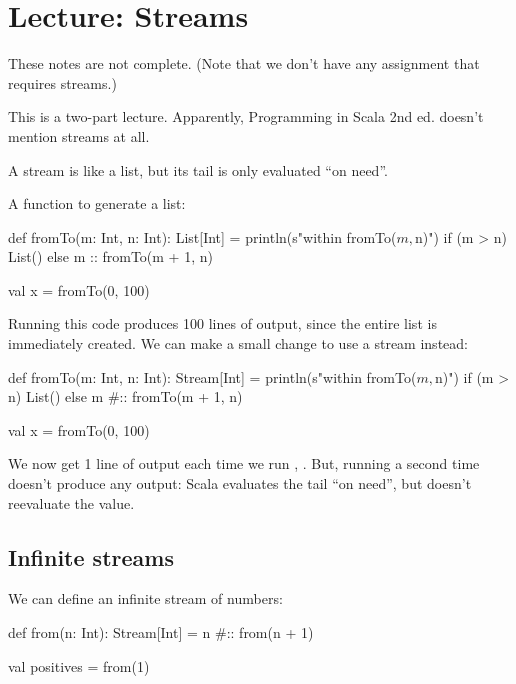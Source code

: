 \startlecture
\chapter{Lecture: Streams}

\begin{instructor}
These notes are not complete. (Note that we don't have any assignment that requires streams.)

This is a two-part lecture.
Apparently, Programming in Scala 2nd ed. doesn't mention streams at all. 
\end{instructor}

A stream is like a list, but its tail is only evaluated ``on need''.

A function to generate a list:

\begin{scalacode}
def fromTo(m: Int, n: Int): List[Int] = {
  println(s"within fromTo($m, $n)")
  if (m > n) {
    List()
  }
  else {
    m :: fromTo(m + 1, n)
  }
}

val x = fromTo(0, 100)
\end{scalacode}

Running this code produces 100 lines of output, since the entire list is
immediately created. We can make a small change to use a stream instead:

\begin{scalacode}
def fromTo(m: Int, n: Int): Stream[Int] = {
  println(s"within fromTo($m, $n)")
  if (m > n) {
    List()
  }
  else {
    m #:: fromTo(m + 1, n)
  }
}

val x = fromTo(0, 100)
\end{scalacode}

We now get 1 line of output each time we run , .
But, running  a second time doesn't produce any output: Scala evaluates
the tail ``on need'', but doesn't reevaluate the value.

\section{Infinite streams}

We can define an infinite stream of numbers:

\begin{scalacode}
def from(n: Int): Stream[Int] = n #:: from(n + 1)

val positives = from(1)
\end{scalacode}

